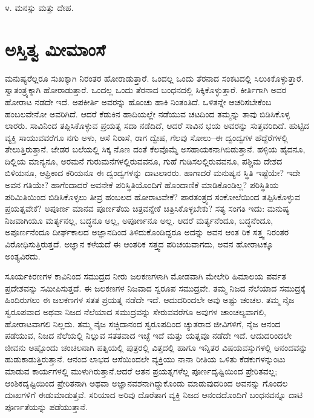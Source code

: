 ೪. ಮನಸ್ಸು ಮತ್ತು ದೇಹ.


\section*{ಅಸ್ತಿತ್ವ ಮೀಮಾಂಸೆ}


ಮನುಷ್ಯರೆಲ್ಲರೂ ಸುಖಕ್ಕಾಗಿ ನಿರಂತರ ಹೋರಾಡುತ್ತಾರೆ. ಒಂದಲ್ಲ ಒಂದು ತೆರನಾದ ಸಂಕಟದಲ್ಲಿ ಸಿಲುಕಿಕೊಳ್ಳುತ್ತಾರೆ. ಸ್ವಾತಂತ್ರ್ಯಕ್ಕಾಗಿ ಹೋರಾಡುತ್ತಾರೆ. ಒಂದಲ್ಲ ಒಂದು ತೆರನಾದ ಬಂಧನದಲ್ಲಿ ಸಿಕ್ಕಿಕೊಳ್ಳುತ್ತಾರೆ. ಕೀರ್ತಿಗಾಗಿ ಅವರ ಹೋರಾಟ ನಡದೇ ಇದೆ. ಅಪಕೀರ್ತಿ ಅವರನ್ನು ಹೊಂಚು ಹಾಕಿ ನಿಂತಂತಿದೆ. ಒಳಿತನ್ನೇ ಆಚರಿಸಬೇಕೆಂಬ ಹಂಬಲವೇನೋ ಅವರಿಗಿದೆ. ಆದರೆ ಕೆಡುಕಿನ ಹಾದಿಯಲ್ಲೇ ನಡೆಯುವ ಚಟದಿಂದ ತಮ್ಮನ್ನು ತಾವು ಬಿಡಿಸಿಕೊಳ್ಳ ಲಾರರು. ಸಾವಿನಿಂದ ತಪ್ಪಿಸಿಕೊಳ್ಳುವ ಪ್ರಯತ್ನ ಸದಾ ನಡೆದಿದೆ, ಆದರೆ ಸಾವಿನ ಭಯ ಅವರನ್ನು ಸುತ್ತವರಿದಿದೆ. ಹುಟ್ಟಿದ ವ್ಯಕ್ತಿ ಸಾಯುವವರೆಗೂ ನಗು ಅಳು, ಆಸೆ ನಿರಾಸೆ, ರಾಗ ದ್ವೇಷ, ಗೆಲವು ಸೋಲು–ಈ ದ್ವಂದ್ವಗಳ ಹೆದ್ದೆರೆಗಳಲ್ಲಿ ತೇಲುತ್ತಿರುತ್ತಾನೆ. ಜೇಡರ ಬಲೆಯಲ್ಲಿ ಸಿಕ್ಕ ನೊಣ ದಂತೆ ಕೆಲವೊಮ್ಮೆ ಅಸಹಾಯಕನಾಗಿಬಿಡುತ್ತಾನೆ. ಹಳ್ಳಿಯ ಹೈದನೂ, ದಿಲ್ಲಿಯ ಮಾನ್ಯನೂ, ಅರಮನೆ ಗುರು\-ಮನೆಗಳಲ್ಲಿರುವವನೂ, ಗುಹೆ ಗುಡಿಸಲಲ್ಲಿರುವವನೂ, ಪಶ್ಚಿಮ ದೇಶದ ಬಿಳಿಯನೂ, ಆಫ್ರಿಕಾದ ಕರಿಯನೂ ಈ ದ್ವಂದ್ವಗಳನ್ನು ದಾಟಲಾರರು. ಹಾಗಾದರೆ ಮನುಷ್ಯನ ಸ್ಥಿತಿ ಇಷ್ಟೆಯೇ? ಇದೇ ಅವನ ಗತಿಯೇ? ಹಾಗೆಂದಾದರೆ ಅವನೇಕೆ ಪರಿಸ್ಥಿತಿಯೊಂದಿಗೆ ಹೊಂದಾಣಿಕೆ ಮಾಡಿಕೊಂಡಿಲ್ಲ? ಪರಿಸ್ಥಿತಿಯ ಪರಿಮಿತಿಯಿಂದ ಬಿಡಿಸಿಕೊಳ್ಳಲು ತೀವ್ರ ಹಂಬಲದ ಹೋರಾಟವೇಕೆ? ಪಾರತಂತ್ರ್ಯದ ಸಂಕೋಲೆಯಿಂದ ತಪ್ಪಿಸಿಕೊಳ್ಳುವ ಪ್ರಯತ್ನವೇಕೆ? ಅಪೂರ್ಣ ಮಾನವ ಪೂರ್ಣತೆಯ ಚಿತ್ರವನ್ನೇಕೆ ಚಿತ್ರಿಸಿಕೊಳ್ಳಬೇಕು? ಸತ್ಯ ಸಂಗತಿ ಇದು: ಮನುಷ್ಯ ನಿಜವಾಗಿಯೂ ಮರ್ತ್ಯನಲ್ಲ, ಬದ್ಧನೂ ಅಲ್ಲ, ಅಪೂರ್ಣನೂ ಅಲ್ಲ. ಆದರೆ ಮರ್ತ್ಯನೆಂದೂ, ಬದ್ಧನೆಂದೂ, ಅಪೂರ್ಣನೆಂದೂ ದೀರ್ಘಕಾಲದ ಅಜ್ಞಾನದಿಂದ ತಿಳಿದುಕೊಂಡಿದ್ದರೂ ಅದನ್ನು ಅವನ ಆಂತ ರಿಕ ಸತ್ತ್ವ ನಿರಂತರ ವಿರೋಧಿಸುತ್ತಿರುತ್ತದೆ. ಅಜ್ಞಾನ ಕಳೆಯದೆ ಈ ಆಂತರಿಕ ಸತ್ತ್ವದ ಪರಿಚಯವಾಗದು, ಅವನ ಹೋರಾಟಕ್ಕೂ ಅಂತ್ಯವಿರದು.

ಸೂರ್ಯಕಿರಣಗಳ ಕಾವಿನಿಂದ ಸಮುದ್ರದ ನೀರು ಜಲಕಣಗಳಾಗಿ ಮೋಡವಾಗಿ ಮೇಲೇರಿ ಹಿಮಾಲಯ ಪರ್ವತ ಪ್ರದೇಶವನ್ನು ಸಮೀಪಿಸುತ್ತದೆ. ಈ ಜಲಕಣಗಳ ನಿಜವಾದ ಸ್ವರೂಪ ಸಮುದ್ರವೇ. ತಮ್ಮ ನಿಜದ ನೆಲೆಯಾದ ಸಮುದ್ರಕ್ಕೆ ಹಿಂದಿರುಗಲು ಈ ಜಲಕಣಗಳ ಸತತ ಪ್ರಯತ್ನ ನಡೆದೇ ಇದೆ. ಆದುದರಿಂದಲೇ ಅವು ಅಷ್ಟು ಚಂಚಲ. ತಮ್ಮ ನೈಜ ಸ್ವರೂಪವಾದ ಅಥವಾ ನಿಜದ ನೆಲೆಯಾದ ಸಮುದ್ರವನ್ನು ಸೇರುವವರೆಗೂ ಅವುಗಳ ಚಾಂಚಲ್ಯವಾಗಲಿ, ಹೋರಾಟವಾಗಲಿ ನಿಲ್ಲದು. ತಮ್ಮ ನೈಜ ಸಚ್ಚಿದಾನಂದ ಸ್ವರೂಪದಿಂದ ಚ್ಯುತರಾದ ಜೀವಿಗಳಿಗೆ, ನೈಜ ಆನಂದ ಪಡೆಯುವ, ನಿಜದ ನೆಲೆಯಲ್ಲಿ ನಿಲ್ಲುವ ಸತತವಾದ ಇಚ್ಛೆ ಇದೆ ಮತ್ತು ಯತ್ನವೂ ನಡೆದೇ ಇದೆ. ಆದುದರಿಂದಲೇ ಜೀವನು ಅಷ್ಟೊಂದು ಚಂಚಲನಾಗಿ ಪತ್ನಿಯಲ್ಲಿ ಪುತ್ರರಲ್ಲಿ ವಿತ್ತದಲ್ಲಿ ಹಾಗೂ ಇನ್ನಿತರ ವಿಷಯವಸ್ತುಗಳಲ್ಲಿ ಆನಂದವನ್ನು ಹುಡುಕಾಡುತ್ತಿರುತ್ತಾನೆ. ಆನಂದ ಲಾಭದ ಆಸೆಯಿಂದಲೇ ವ್ಯಕ್ತಿಯು ನಾನಾ ರೀತಿಯ ಒಳಿತು ಕೆಡಕುಗಳನ್ನುಂಟು ಮಾಡುವ ಕಾರ್ಯಗಳಲ್ಲಿ ಮುಳುಗಿರುತ್ತಾನೆ.ಆದರೆ ಆತನ ಪ್ರಯತ್ನಗಳೆಲ್ಲ ಪೂರ್ಣದೃಷ್ಟಿಯಿಂದ ಪ್ರೇರಿತವಲ್ಲ; ಆಂಶಿಕದೃಷ್ಟಿಯಿಂದ ಪ್ರೇರಿತನಾಗಿ ಅಥವಾ ಅಜ್ಞಾನವಶನಾಗಿದ್ದುಕೊಂಡು ಮಾಡುವುದರಿಂದ ಅವನನ್ನು ಗೊಂದಲ ದುಃಖಗಳಿಗೆ ಈಡುಮಾಡುತ್ತವೆ. ಸರಿಯಾದ ಅರಿವು ದೊರೆತಾಗ ವ್ಯಕ್ತಿ ನಿಜದ ಆನಂದದೊಂದಿಗೆ ಬಂಧನವನ್ನೂ ದಾಟಿ ಪೂರ್ಣತೆಯನ್ನು ಪಡೆಯುತ್ತಾನೆ. 

